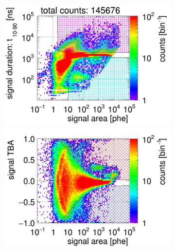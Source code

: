 \begin{landscape}%
	\begin{figure}[!p]
		\centering
		\begin{subfigure}[t]{0.32\textwidth} %
			\centering
			\includegraphics[width=\figurewidth,clip,trim={0 98 0 15}]{Figures/GasTest/CutsValid/res64771/pdpa22Vecfig64771.jpg}
			\includegraphics[width=\figurewidth,clip,trim={0 8 0 40}]{Figures/GasTest/CutsValid/res64771/tbapa22Vecfig64771.jpg}
			\caption{}
			\label{fig:signal selection dv 16 01}
		\end{subfigure}
		\begin{subfigure}[t]{0.32\textwidth}
			\centering

\end{subfigure}
\end{figure}
\end{landscape}
